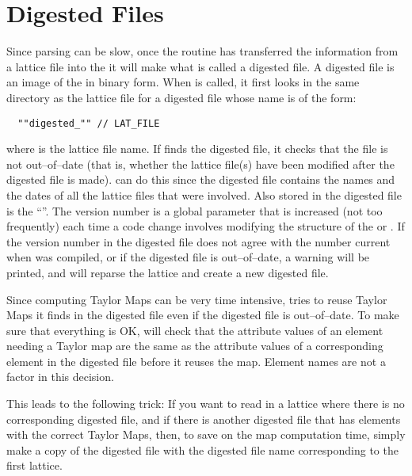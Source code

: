 \section{Digested Files}

Since parsing can be slow, once the  routine has transferred the information from a
lattice file into the  it will make what is called a digested file. A digested file
is an image of the  in binary form. When  is called, it first looks
in the same directory as the lattice file for a digested file whose name is of the form:
\begin{verbatim}
  ""digested_"" // LAT_FILE 
\end{verbatim}
where  is the lattice file name. If  finds the digested file, it checks
that the file is not out--of--date (that is, whether the lattice file(s) have been modified after
the digested file is made).   can do this since the digested file contains the names
and the dates of all the lattice files that were involved. Also stored in the digested file is the
``\bmad {}''. The \bmad version number is a global parameter that is increased (not
too frequently) each time a code change involves modifying the structure of the  or
. If the \bmad version number in the digested file does not agree with the number
current when  was compiled, or if the digested file is out--of--date, a warning will
be printed, and  will reparse the lattice and create a new digested file.

Since computing Taylor Maps can be very time intensive,  tries to reuse Taylor Maps
it finds in the digested file even if the digested file is out--of--date. To make sure that
everything is OK,  will check that the attribute values of an element needing a
Taylor map are the same as the attribute values of a corresponding element in the digested file
before it reuses the map. Element names are not a factor in this decision.

This leads to the following trick: If you want to read in a lattice where there is no corresponding
digested file, and if there is another digested file that has elements with the correct Taylor Maps,
then, to save on the map computation time, simply make a copy of the digested file with the digested
file name corresponding to the first lattice.

